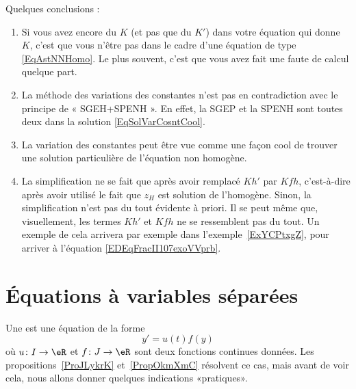 Quelques conclusions :

\begin{enumerate}
	\item
	      Si vous avez encore du \( K\) (et pas que du \( K'\)) dans votre équation qui donne \( K\), c'est que vous n'être pas dans le cadre d'une équation de type \eqref{EqAstNNHomo}. Le plus souvent, c'est que vous avez fait une faute de calcul quelque part.

	\item
	      La méthode des variations des constantes n'est pas en contradiction avec le principe de « SGEH+SPENH ». En effet, la SGEP et la SPENH sont toutes deux dans la solution \eqref{EqSolVarCosntCool}.

	\item
	      La variation des constantes peut être vue comme une façon cool de trouver une solution particulière de l'équation non homogène.

	\item
	      La simplification ne se fait que après avoir remplacé \( Kh'\) par \( Kfh\), c'est-à-dire après avoir utilisé le fait que \( z_H\) est solution de l'homogène. Sinon, la simplification n'est pas du tout évidente à priori. Il se peut même que, visuellement, les termes \( Kh'\) et \( Kfh\) ne se ressemblent pas du tout. Un exemple de cela arrivera par exemple dans l'exemple~\ref{ExYCPtxgZ}, pour arriver à l'équation \eqref{EDEqFracII107exoVVprb}.

\end{enumerate}


\section{Équations à variables séparées}
\label{Secvarsep}

Une  est une équation  de la forme
\begin{equation}		\label{EqDiffSeparee}
	y'=u(t)f(y)
\end{equation}
où \( u\colon I\to \eR\) et \( f\colon J\to \eR\) sont deux fonctions continues données. Les propositions~\ref{ProJLykrK} et~\ref{PropOkmXmC} résolvent ce cas, mais avant de voir cela, nous allons donner quelques indications «pratiques».

